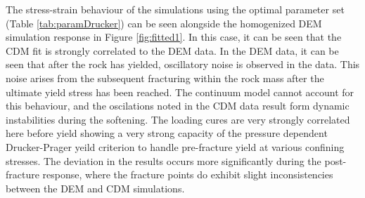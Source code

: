 The stress-strain behaviour of the simulations using the optimal parameter set (Table \ref{tab:paramDrucker}) can be seen alongside the homogenized DEM simulation response in Figure \ref{fig:fitted1}. In this case, it can be seen that the CDM fit is strongly correlated to the DEM data. In the DEM data, it can be seen that after the rock has yielded, oscillatory noise is observed in the data. This noise arises from the subsequent fracturing within the rock mass after the ultimate yield stress has been reached. The continuum model cannot account for this behaviour, and the oscilations noted in the CDM data result form dynamic instabilities during the softening. The loading cures are very strongly correlated here before yield showing a very strong capacity of the pressure dependent Drucker-Prager yeild criterion to handle pre-fracture yield at various confining stresses. The deviation in the results occurs more significantly during the post-fracture response, where the fracture points do exhibit slight inconsistencies between the DEM and CDM simulations. 
